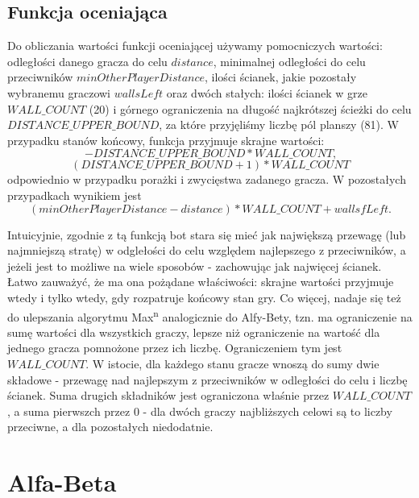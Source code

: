 \documentclass{pracamgr}
\begin{document}
\subsection{Funkcja oceniająca}

Do obliczania wartości funkcji oceniającej używamy pomocniczych wartości: odległości danego gracza do celu \(distance\), minimalnej odległości do celu przeciwników \(minOtherPlayerDistance\), ilości ścianek, jakie pozostały wybranemu graczowi \(wallsLeft\) oraz dwóch stałych: ilości ścianek w grze \(WALL\_COUNT\) (20) i górnego ograniczenia na długość najkrótszej ścieżki do celu \(DISTANCE\_UPPER\_BOUND\), za które przyjęliśmy liczbę pól planszy (81).
W przypadku stanów końcowy, funkcja przyjmuje skrajne wartości: \[-DISTANCE\_UPPER\_BOUND * WALL\_COUNT \text{,}\] \[(DISTANCE\_UPPER\_BOUND + 1) * WALL\_COUNT\] odpowiednio w przypadku porażki i zwycięstwa zadanego gracza.
W pozostałych przypadkach wynikiem jest \[(minOtherPlayerDistance - distance) * WALL\_COUNT + wallsfLeft \text{.}\]

Intuicyjnie, zgodnie z tą funkcją bot stara się mieć jak największą przewagę (lub najmniejszą stratę) w odglełości do celu względem najlepszego z przeciwników, a jeżeli jest to możliwe na wiele sposobów - zachowując jak najwięcej ścianek.
Łatwo zauważyć, że ma ona pożądane właściwości: skrajne wartości przyjmuje wtedy i tylko wtedy, gdy rozpatruje końcowy stan gry.
Co więcej, nadaje się też do ulepszania algorytmu Max\textsuperscript{n} analogicznie do Alfy-Bety, tzn. ma ograniczenie na sumę wartości dla wszystkich graczy, lepsze niż ograniczenie na wartość dla jednego gracza pomnożone przez ich liczbę.
Ograniczeniem tym jest \(WALL\_COUNT\).
W istocie, dla każdego stanu gracze wnoszą do sumy dwie składowe - przewagę nad najlepszym z przeciwników w odległości do celu i liczbę ścianek.
Suma drugich składników jest ograniczona właśnie przez \(WALL\_COUNT\), a suma pierwszch przez \(0\) - dla dwóch graczy najbliższych celowi są to liczby przeciwne, a dla pozostałych niedodatnie.

\section {Alfa-Beta}
\end{document}
